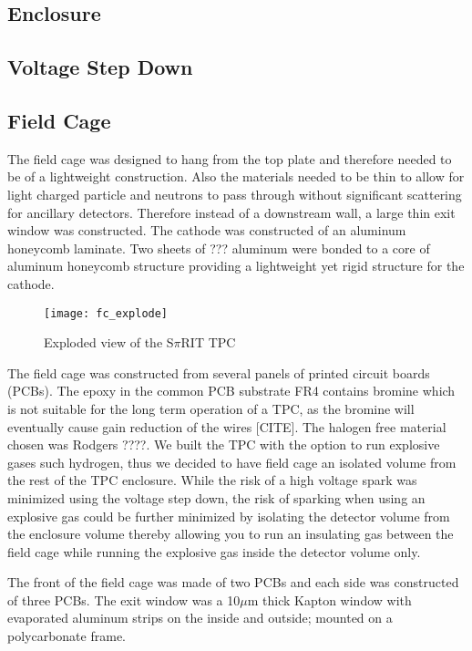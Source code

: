 \subsection{Enclosure}

\subsection{Voltage Step Down}

\subsection{Field Cage}

The field cage was designed to hang from the top plate and therefore needed to be of a lightweight construction. Also the materials needed to be thin to allow for light charged particle and neutrons to pass through without significant scattering for ancillary detectors. Therefore instead of a downstream wall, a large thin exit window was constructed. The cathode was constructed of an aluminum honeycomb laminate. Two sheets of ??? aluminum were bonded to a core of aluminum honeycomb structure providing a lightweight yet rigid structure for the cathode. 

\begin{figure}[H]
\texttt{[image: fc\_explode]}
\caption{Exploded view of the S$\pi$RIT TPC}
\label{fig:fc_explode}
\end{figure}

The field cage was constructed from several panels of printed circuit boards (PCBs). The epoxy in the common PCB substrate FR4 contains bromine which is not suitable for the long term operation of a TPC, as the bromine will eventually cause gain reduction of the wires [CITE]. The halogen free material chosen was Rodgers ????. We built the TPC with the option to run explosive gases such  hydrogen, thus we decided to have field cage an isolated volume from the rest of the TPC enclosure. While the risk of a high voltage spark was minimized using the voltage step down, the risk of sparking when using an explosive gas could be further minimized by isolating the detector volume from the enclosure volume thereby allowing you to run an insulating gas between the field cage while running the explosive gas inside the detector volume only.  

The front of the field cage was made of two PCBs and each side was constructed of three PCBs. The exit window was a 10$\mu$m thick Kapton window with evaporated aluminum strips on the inside and outside; mounted on a polycarbonate frame.

